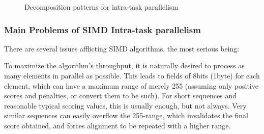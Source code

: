 \begin{figure}[htb!]
{{		\label{pattern-continuous}
	}
	\quad
}
\caption{Decomposition patterns for intra-task parallelism}
\end{figure}




		
\subsubsection{Main Problems of SIMD Intra-task parallelism}
		
There are several  issues afflicting SIMD algorithms, the most serious being:


To maximize the algorithm's throughput, it is naturally desired to process as many elements in parallel as possible. This leads to fields of 8bits (1byte) for each element, which can have a maximum range of merely 255 (assuming only positive scores and penalties, or convert them to be such). For short sequences and reasonable typical scoring values, this is usually enough, but not always. Very similar sequences can easily overflow the 255-range, which invalidates the final score obtained, and forces alignment to be repeated with a higher range.
			
